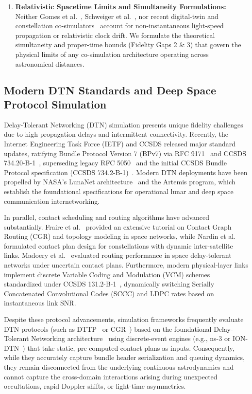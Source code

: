 \documentclass[a4paper,fleqn]{cas-sc}
\begin{document}
\begin{enumerate}
    \item \textbf{Relativistic Spacetime Limits and Simultaneity Formulations:} Neither Gomes et al.~\cite{simpat_adaptive}, Schweiger et al.~\cite{simpat_multirate}, nor recent digital-twin and constellation co-simulators~\cite{mao_satellite_dt_2024, kassing_hypatia_2020} account for non-instantaneous light-speed propagation or relativistic clock drift. We formulate the theoretical simultaneity and proper-time bounds (Fidelity Gaps 2 \& 3) that govern the physical limits of any co-simulation architecture operating across astronomical distances.
\end{enumerate}

\subsection{Modern DTN Standards and Deep Space Protocol Simulation}
Delay-Tolerant Networking (DTN) simulation presents unique fidelity challenges due to high propagation delays and intermittent connectivity. Recently, the Internet Engineering Task Force (IETF) and CCSDS released major standard updates, ratifying Bundle Protocol Version 7 (BPv7) via RFC 9171~\cite{rfc9171} and CCSDS 734.20-B-1~\cite{ccsds_bpv7_2024}, superseding legacy RFC 5050~\cite{dtn_emulation} and the initial CCSDS Bundle Protocol specification (CCSDS 734.2-B-1)~\cite{ccsds_bp}. Modern DTN deployments have been propelled by NASA's LunaNet architecture~\cite{nasa_lunanet_2023, israel_lunanet_2020} and the Artemis program, which establish the foundational specifications for operational lunar and deep space communication internetworking.

In parallel, contact scheduling and routing algorithms have advanced substantially. Fraire et al.~\cite{fraire_cgr_tutorial_2021} provided an extensive tutorial on Contact Graph Routing (CGR) and topology modeling in space networks, while Nardin et al.~\cite{nardin_contact_plan_2022} formulated contact plan design for constellations with dynamic inter-satellite links. Madoery et al.~\cite{madoery_uncertain_cgr_2018} evaluated routing performance in space delay-tolerant networks under uncertain contact plans. Furthermore, modern physical-layer links implement discrete Variable Coding and Modulation (VCM) schemes standardized under CCSDS 131.2-B-1~\cite{ccsds_vcm_131_2}, dynamically switching Serially Concatenated Convolutional Codes (SCCC) and LDPC rates based on instantaneous link SNR.

Despite these protocol advancements, simulation frameworks frequently evaluate DTN protocols (such as DTTP~\cite{acta_dttp} or CGR~\cite{acta_cgr}) based on the foundational Delay-Tolerant Networking architecture~\cite{cerf_dtn} using discrete-event engines (e.g., ns-3 or ION-DTN~\cite{ion_dtn}) that take static, pre-computed contact plans as inputs. Consequently, while they accurately capture bundle header serialization and queuing dynamics, they remain disconnected from the underlying continuous astrodynamics and cannot capture the cross-domain interactions arising during unexpected occultations, rapid Doppler shifts, or light-time asymmetries.
\end{document}
